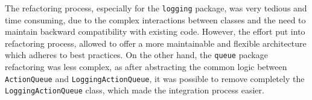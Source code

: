 The refactoring process, especially for the \texttt{logging} package, was very tedious and time consuming, due to the complex interactions between classes and the need to maintain backward compatibility with existing code. However, the effort put into refactoring process, allowed to offer a more maintainable and flexible architecture which adheres to best practices. On the other hand, the \texttt{queue} package refactoring was less complex, as after abstracting the common logic between \texttt{ActionQueue} and \texttt{LoggingActionQueue}, it was possible to remove completely the \texttt{LoggingActionQueue} class, which made the integration process easier.

